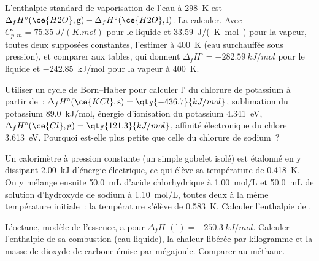 \begin{exercise}[$\star\star$]\label{exo:b2:reaction-enthalpy:6}
L'enthalpie standard de vaporisation de l'eau à \qty{298}{K} est
$\Delta_f H^\circ(\ce{H2O}, \text{g}) - \Delta_f H^\circ(\ce{H2O},
\text{l})$. La calculer. Avec $C_{p,m}^\circ = \qty{75.35}{J/(K.mol)}$ pour
le liquide et \qty{33.59}{J/(K.mol)} pour la vapeur, toutes deux supposées
constantes, l'estimer à \qty{400}{K} (eau surchauffée sous pression),
et comparer aux tables, qui donnent $\Delta_f H^\circ =
\qty{-282.59}{kJ/mol}$ pour le liquide et \qty{-242.85}{kJ/mol} pour la
vapeur à \qty{400}{K}.
\end{exercise}

\begin{exercise}[$\star\star$]\label{exo:b2:reaction-enthalpy:7}
Utiliser un cycle de Born--Haber pour calculer l' du chlorure
de potassium à partir de~: $\Delta_f H^\circ(\ce{KCl}, \text{s}) = \qty{-436.7}{kJ/mol}$,
sublimation du potassium \qty{89.0}{kJ/mol}, énergie d'ionisation du
potassium \qty{4.341}{eV}, $\Delta_f H^\circ(\ce{Cl}, \text{g}) =
\qty{121.3}{kJ/mol}$, affinité électronique du chlore \qty{3.613}{eV}. Pourquoi
est-elle plus petite que celle du chlorure de sodium~?
\end{exercise}

\begin{exercise}[$\star\star$]\label{exo:b2:reaction-enthalpy:8}
Un calorimètre à pression constante (un simple gobelet isolé) est étalonné en y dissipant \qty{2.00}{kJ}
d'énergie électrique, ce qui élève sa température de \qty{0.418}{K}. On y mélange ensuite
\qty{50.0}{mL} d'acide chlorhydrique à \qty{1.00}{mol/L}
et \qty{50.0}{mL} de solution d'hydroxyde de sodium à \qty{1.10}{mol/L},
toutes deux à la même température initiale~: la température s'élève de
\qty{0.583}{K}. Calculer l'enthalpie de .
\end{exercise}

\begin{exercise}[$\star\star$]\label{exo:b2:reaction-enthalpy:9}
L'octane, modèle de l'essence, a pour $\Delta_f H^\circ(\text{l}) =
\qty{-250.3}{kJ/mol}$. Calculer l'enthalpie de sa combustion (eau
liquide), la chaleur libérée par kilogramme et la masse de dioxyde de carbone
émise par mégajoule. Comparer au méthane.
\end{exercise}

